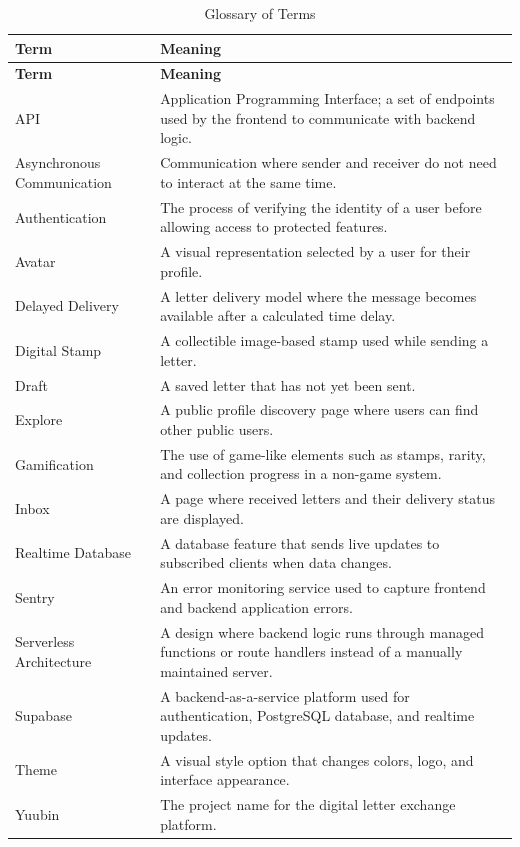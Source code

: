 ﻿\documentclass[12pt,a4paper]{report}
\begin{document}
\begin{longtable}{p{3.5cm} p{10.5cm}}
\caption{Glossary of Terms}
\label{tab:glossary}\\
\toprule
\textbf{Term} & \textbf{Meaning} \\
\midrule
\endfirsthead
\toprule
\textbf{Term} & \textbf{Meaning} \\
\midrule
\endhead
API & Application Programming Interface; a set of endpoints used by the frontend to communicate with backend logic. \\
Asynchronous Communication & Communication where sender and receiver do not need to interact at the same time. \\
Authentication & The process of verifying the identity of a user before allowing access to protected features. \\
Avatar & A visual representation selected by a user for their profile. \\
Delayed Delivery & A letter delivery model where the message becomes available after a calculated time delay. \\
Digital Stamp & A collectible image-based stamp used while sending a letter. \\
Draft & A saved letter that has not yet been sent. \\
Explore & A public profile discovery page where users can find other public users. \\
Gamification & The use of game-like elements such as stamps, rarity, and collection progress in a non-game system. \\
Inbox & A page where received letters and their delivery status are displayed. \\
Realtime Database & A database feature that sends live updates to subscribed clients when data changes. \\
Sentry & An error monitoring service used to capture frontend and backend application errors. \\
Serverless Architecture & A design where backend logic runs through managed functions or route handlers instead of a manually maintained server. \\
Supabase & A backend-as-a-service platform used for authentication, PostgreSQL database, and realtime updates. \\
Theme & A visual style option that changes colors, logo, and interface appearance. \\
Yuubin & The project name for the digital letter exchange platform. \\
\bottomrule
\end{longtable}

\clearpage

\newpage
\end{document}
